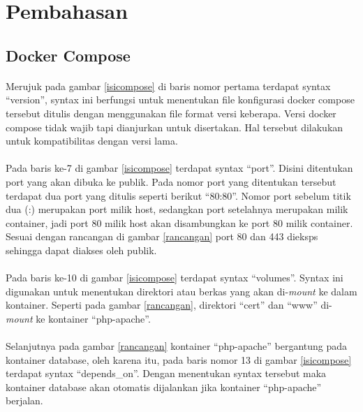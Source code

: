 \documentclass[./bab_4.tex]{subfiles}
\begin{document}
\section{Pembahasan}
\subsection{Docker Compose}
\paragraph*{}Merujuk pada gambar \ref{isicompose} di baris
nomor pertama terdapat syntax ``version'', syntax ini
berfungsi untuk menentukan file konfigurasi docker compose
tersebut ditulis dengan menggunakan file format versi
keberapa. Versi docker compose tidak wajib tapi dianjurkan
untuk disertakan. Hal tersebut dilakukan untuk
kompatibilitas dengan versi lama.

\paragraph*{}Pada baris ke-7 di gambar \ref{isicompose}
terdapat syntax ``port''. Disini ditentukan port yang akan
dibuka ke publik. Pada nomor port yang ditentukan tersebut
terdapat dua port yang ditulis seperti berikut ``80:80''.
Nomor port sebelum titik dua (:) merupakan port milik host,
sedangkan port setelahnya merupakan milik container, jadi
port 80 milik host akan disambungkan ke port 80 milik
container. Sesuai dengan rancangan di gambar \ref{rancangan}
port 80 dan 443 dieksps sehingga dapat diakses oleh publik.

\paragraph*{}Pada baris ke-10 di gambar \ref{isicompose}
terdapat syntax ``volumes''. Syntax ini digunakan untuk
menentukan direktori atau berkas yang akan di-\textit{mount}
ke dalam kontainer. Seperti pada gambar \ref{rancangan},
direktori ``cert'' dan ``www'' di-\textit{mount} ke
kontainer ``php-apache''.

\paragraph*{}Selanjutnya pada gambar \ref{rancangan}
kontainer ``php-apache'' bergantung pada kontainer database,
oleh karena itu, pada baris nomor 13 di gambar
\ref{isicompose} terdapat syntax ``depends\_on''. Dengan
menentukan syntax tersebut maka kontainer database akan
otomatis dijalankan jika kontainer ``php-apache'' berjalan.
\end{document}
